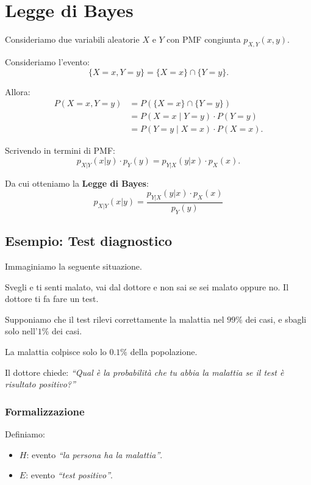 \section{Legge di Bayes}

Consideriamo due variabili aleatorie $X$ e $Y$ con PMF congiunta $p_{X,Y}(x,y)$.

Consideriamo l'evento:
\[
\{X=x, Y=y\} = \{X=x\} \cap \{Y=y\}.
\]

Allora:
\begin{align*}
P(X=x, Y=y)
&= P(\{X=x\} \cap \{Y=y\}) \\
&= P(X=x \mid Y=y)\cdot P(Y=y) \\
&= P(Y=y \mid X=x)\cdot P(X=x).
\end{align*}

Scrivendo in termini di PMF:
\[
p_{X|Y}(x|y)\cdot p_Y(y) = p_{Y|X}(y|x)\cdot p_X(x).
\]

Da cui otteniamo la \textbf{Legge di Bayes}:
\begin{equation}
\boxed{
p_{X|Y}(x|y) = \frac{p_{Y|X}(y|x)\cdot p_X(x)}{p_Y(y)}
}
\end{equation}

\subsection{Esempio: Test diagnostico}

Immaginiamo la seguente situazione.

Svegli e ti senti malato, vai dal dottore e non sai se sei malato oppure no. Il dottore ti fa fare un test.

Supponiamo che il test rilevi correttamente la malattia nel $99\%$ dei casi, e sbagli solo nell'$1\%$ dei casi.

La malattia colpisce solo lo $0.1\%$ della popolazione.

Il dottore chiede:
\textit{``Qual è la probabilità che tu abbia la malattia se il test è risultato positivo?''}

\subsubsection{Formalizzazione}

Definiamo:

\begin{itemize}
\item $H$: evento \textit{``la persona ha la malattia''}.
\item $E$: evento \textit{``test positivo''}.
\end{itemize}

